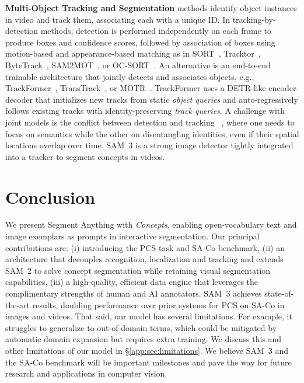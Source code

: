 \documentclass[]{fairmeta}
\newcommand{\eg}{e.g., }
\newcommand{\samtwo}{SAM~2\xspace}
\newcommand{\model}{SAM~3\xspace}
\newcommand{\task}{PCS\xspace}
\newcommand{\dsname}{{SA-Co}\xspace}
\begin{document}
\textbf{Multi-Object Tracking and Segmentation} 
methods identify object instances in video and track them, associating each with a unique ID. %
In tracking-by-detection methods, detection is performed independently on each frame to produce boxes and confidence scores, followed by association of boxes using motion-based and appearance-based matching as in SORT~\citep{bewley2016simple,wojke2017simple}, Tracktor~\citep{bergmann2019tracking}, ByteTrack~\citep{zhang2022bytetrack}, SAM2MOT~\citep{jiang2025sam2mot}, or OC-SORT~\citep{cao2023observation}. An alternative is an end-to-end trainable architecture that jointly detects and associates objects, \eg TrackFormer~\citep{meinhardt2022trackformer}, TransTrack~\citep{sun2020transtrack}, or MOTR~\citep{zeng2022motr}. TrackFormer uses a DETR-like encoder-decoder that initializes new tracks from static \textit{object queries} and auto-regressively follows existing tracks with identity-preserving \textit{track queries}. A challenge with joint models is the conflict between detection and tracking ~\citep{feichtenhofer2017detect, yu2023motrv3}, where one needs to focus on semantics while the other on disentangling identities, even if their spatial locations overlap over time.
\model is a strong image detector tightly integrated into a tracker to segment concepts in videos.

\vspace{-10pt}
\section{Conclusion}
\vspace{-5pt}

We present Segment Anything with \textit{Concepts}, enabling open-vocabulary text and image exemplars as prompts in interactive segmentation. Our principal contributions are: (i) introducing the \task task and \dsname benchmark, (ii) an architecture that decouples recognition, localization and tracking and extends \samtwo to solve concept segmentation while retaining visual segmentation capabilities, (iii) a high-quality, efficient data engine that leverages the complimentary strengths of human and AI annotators. \model achieves state-of-the-art results, doubling performance over prior systems for \task on \dsname in images and videos. That said, our model has several limitations. For example, it struggles to generalize to out-of-domain terms, which could be mitigated by automatic domain expansion but requires extra training. We discuss this and other limitations of our model in \S\ref{app:sec:limitations}. We believe \model and the \dsname benchmark will be important milestones and pave the way for future research and applications in computer vision.
\end{document}
